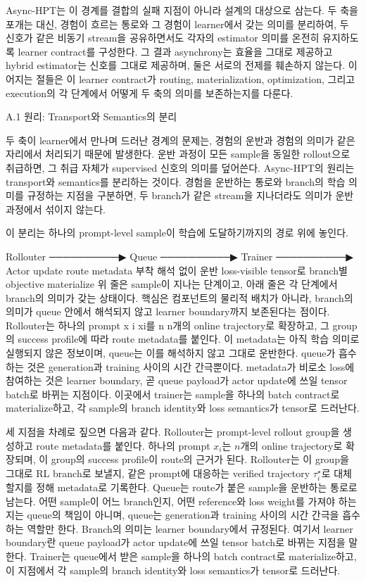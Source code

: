 Async-HPT는 이 경계를 결합의 실패 지점이 아니라 설계의 대상으로 삼는다. 두 축을 포개는 대신, 경험이 흐르는 통로와 그 경험이 learner에서 갖는 의미를 분리하여, 두 신호가 같은 비동기 stream을 공유하면서도 각자의 estimator 의미를 온전히 유지하도록 learner contract를 구성한다. 그 결과 asynchrony는 효율을 그대로 제공하고 hybrid estimator는 신호를 그대로 제공하며, 둘은 서로의 전제를 훼손하지 않는다. 이어지는 절들은 이 learner contract가 routing, materialization, optimization, 그리고 execution의 각 단계에서 어떻게 두 축의 의미를 보존하는지를 다룬다.

A.1 원리: Transport와 Semantics의 분리


두 축이 learner에서 만나며 드러난 경계의 문제는, 경험의 운반과 경험의 의미가 같은 자리에서 처리되기 때문에 발생한다. 운반 과정이 모든 sample을 동일한 rollout으로 취급하면, 그 취급 자체가 supervised 신호의 의미를 덮어쓴다. Async-HPT의 원리는 transport와 semantics를 분리하는 것이다. 경험을 운반하는 통로와 branch의 학습 의미를 규정하는 지점을 구분하면, 두 branch가 같은 stream을 지나더라도 의미가 운반 과정에서 섞이지 않는다.

이 분리는 하나의 prompt-level sample이 학습에 도달하기까지의 경로 위에 놓인다.

Rollouter  ──────────▶  Queue  ──────────▶  Trainer  ──────────▶  Actor update
route metadata 부착      해석 없이 운반       loss-visible tensor로     branch별 objective
                                            materialize
위 줄은 sample이 지나는 단계이고, 아래 줄은 각 단계에서 branch의 의미가 갖는 상태이다. 핵심은 컴포넌트의 물리적 배치가 아니라, branch의 의미가 queue 안에서 해석되지 않고 learner boundary까지 보존된다는 점이다. Rollouter는 하나의 prompt 
x
i
xi​를 
n
n개의 online trajectory로 확장하고, 그 group의 success profile에 따라 route metadata를 붙인다. 이 metadata는 아직 학습 의미로 실행되지 않은 정보이며, queue는 이를 해석하지 않고 그대로 운반한다. queue가 흡수하는 것은 generation과 training 사이의 시간 간극뿐이다. metadata가 비로소 loss에 참여하는 것은 learner boundary, 곧 queue payload가 actor update에 쓰일 tensor batch로 바뀌는 지점이다. 이곳에서 trainer는 sample을 하나의 batch contract로 materialize하고, 각 sample의 branch identity와 loss semantics가 tensor로 드러난다.

세 지점을 차례로 짚으면 다음과 같다. Rollouter는 prompt-level rollout group을 생성하고 route metadata를 붙인다. 하나의 prompt $x_i$는 $n$개의 online trajectory로 확장되며, 이 group의 success profile이 route의 근거가 된다. Rollouter는 이 group을 그대로 RL branch로 보낼지, 같은 prompt에 대응하는 verified trajectory $\tau_i^\star$로 대체할지를 정해 metadata로 기록한다. Queue는 route가 붙은 sample을 운반하는 통로로 남는다. 어떤 sample이 어느 branch인지, 어떤 reference와 loss weight를 가져야 하는지는 queue의 책임이 아니며, queue는 generation과 training 사이의 시간 간극을 흡수하는 역할만 한다. Branch의 의미는 learner boundary에서 규정된다. 여기서 learner boundary란 queue payload가 actor update에 쓰일 tensor batch로 바뀌는 지점을 말한다. Trainer는 queue에서 받은 sample을 하나의 batch contract로 materialize하고, 이 지점에서 각 sample의 branch identity와 loss semantics가 tensor로 드러난다.

